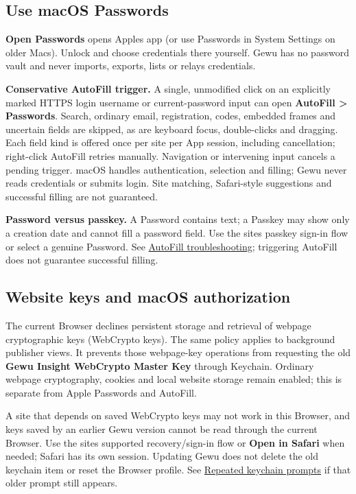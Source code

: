 \documentclass[10pt,letterpaper,oneside]{scrreprt}
\begin{document}
\subsection{Use macOS Passwords}\label{use-macos-passwords}

\textbf{Open Passwords} opens Apple\textquotesingle s app (or use Passwords in System Settings on older Macs). Unlock and choose credentials there yourself. Gewu has no password vault and never imports, exports, lists or relays credentials.

\textbf{Conservative AutoFill trigger.} A single, unmodified click on an explicitly marked HTTPS login username or current-password input can open \textbf{AutoFill \textgreater{} Passwords}. Search, ordinary email, registration, codes, embedded frames and uncertain fields are skipped, as are keyboard focus, double-clicks and dragging. Each field kind is offered once per site per App session, including cancellation; right-click AutoFill retries manually. Navigation or intervening input cancels a pending trigger. macOS handles authentication, selection and filling; Gewu never reads credentials or submits login. Site matching, Safari-style suggestions and successful filling are not guaranteed.

\textbf{Password versus passkey.} A Password contains text; a Passkey may show only a creation date and cannot fill a password field. Use the site\textquotesingle s passkey sign-in flow or select a genuine Password. See \hyperref[troubleshooting]{AutoFill troubleshooting}; triggering AutoFill does not guarantee successful filling.

\subsection{Website keys and macOS authorization}\label{browser-website-keys}

The current Browser declines persistent storage and retrieval of webpage cryptographic keys (WebCrypto keys). The same policy applies to background publisher views. It prevents those webpage-key operations from requesting the old \textbf{Gewu Insight WebCrypto Master Key} through Keychain. Ordinary webpage cryptography, cookies and local website storage remain enabled; this is separate from Apple Passwords and AutoFill.

A site that depends on saved WebCrypto keys may not work in this Browser, and keys saved by an earlier Gewu version cannot be read through the current Browser. Use the site\textquotesingle s supported recovery/sign-in flow or \textbf{Open in Safari} when needed; Safari has its own session. Updating Gewu does not delete the old keychain item or reset the Browser profile. See \hyperref[browser-key-prompt]{Repeated keychain prompts} if that older prompt still appears.
\end{document}

